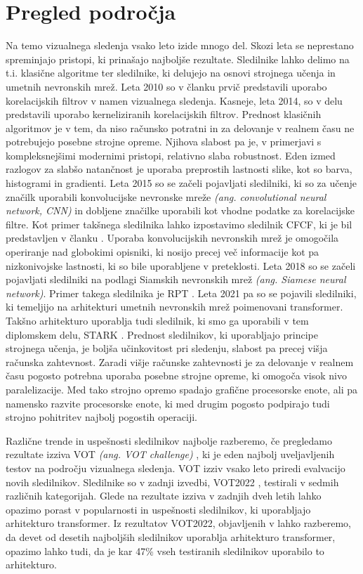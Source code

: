 \documentclass[a4paper,12pt,openright]{book}
\begin{document}
\section{Pregled področja}
Na temo vizualnega sledenja vsako leto izide mnogo del. Skozi leta se neprestano spreminjajo pristopi, ki prinašajo najboljše rezultate. Sledilnike lahko delimo na t.i. klasične algoritme ter sledilnike, ki delujejo na osnovi strojnega učenja in umetnih nevronskih mrež. Leta 2010 so v članku \cite{mosse} prvič predstavili uporabo korelacijskih filtrov v namen vizualnega sledenja. Kasneje, leta 2014, so v delu \cite{kcf} predstavili uporabo kerneliziranih korelacijskih filtrov. Prednost klasičnih algoritmov je v tem, da niso računsko potratni in za delovanje v realnem času ne potrebujejo posebne strojne opreme. Njihova slabost pa je, v primerjavi s kompleksnejšimi modernimi pristopi, relativno slaba robustnost. Eden izmed razlogov za slabšo natančnost je uporaba preprostih lastnosti slike, kot so barva, histogrami in gradienti. Leta 2015 so se začeli pojavljati sledilniki, ki so za učenje značilk uporabili konvolucijske nevronske mreže \emph{(ang. convolutional neural network, CNN)} in dobljene značilke uporabili kot vhodne podatke za korelacijske filtre. Kot primer takšnega sledilnika lahko izpostavimo sledilnik CFCF, ki je bil predstavljen v članku \cite{cfcf}. Uporaba konvolucijskih nevronskih mrež je omogočila operiranje nad globokimi opisniki, ki nosijo precej več informacije kot pa nizkonivojske lastnosti, ki so bile uporabljene v preteklosti. Leta 2018 so se začeli pojavljati sledilniki na podlagi Siamskih nevronskih mrež \emph{(ang. Siamese neural network)}. Primer takega sledilnika je RPT \cite{siamese}. Leta 2021 pa so se pojavili sledilniki, ki temeljijo na arhitekturi umetnih nevronskih mrež poimenovani transformer. Takšno arhitekturo uporablja tudi sledilnik, ki smo ga uporabili v tem diplomskem delu, STARK \cite{stark}. Prednost sledilnikov, ki uporabljajo principe strojnega učenja, je boljša učinkovitost pri sledenju, slabost pa precej višja računska zahtevnost. Zaradi višje računske zahtevnosti je za delovanje v realnem času pogosto potrebna uporaba posebne strojne opreme, ki omogoča visok nivo paralelizacije. Med tako strojno opremo spadajo grafične procesorske enote, ali pa namensko razvite procesorske enote, ki med drugim pogosto podpirajo tudi strojno pohitritev najbolj pogostih operaciji.

Različne trende in uspešnosti sledilnikov najbolje razberemo, če pregledamo rezultate izziva VOT \emph{(ang. VOT challenge)} \cite{vot}, ki je eden najbolj uveljavljenih testov na področju vizualnega sledenja. VOT izziv vsako leto priredi evalvacijo novih sledilnikov. Sledilnike so v zadnji izvedbi, VOT2022 \cite{vot2022}, testirali v sedmih različnih kategorijah. Glede na rezultate izziva v zadnjih dveh letih lahko opazimo porast v popularnosti in uspešnosti sledilnikov, ki uporabljajo arhitekturo transformer. Iz rezultatov VOT2022, objavljenih v \cite{vot2022} lahko razberemo, da devet od desetih najboljših sledilnikov uporablja arhitekturo transformer, opazimo lahko tudi, da je kar 47\% vseh testiranih sledilnikov uporabilo to arhitekturo.
\end{document}
